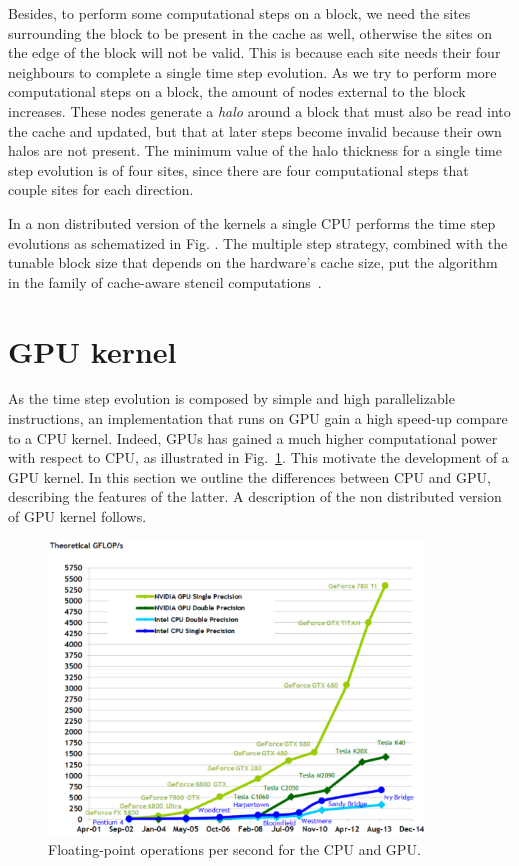 Besides, to perform some computational steps on a block, we need the sites surrounding the block to be present in the cache as well, otherwise the sites on the edge of the block will not be valid. This is because each site needs their four neighbours to complete a single time step evolution. As we try to perform more computational steps on a block, the amount of nodes external to the block increases. These nodes generate a \textit{halo} around a block that must also be read into the cache and updated, but that at later steps become invalid because their own halos are not present. The minimum value of the halo thickness for a single time step evolution is of four sites, since there are four computational steps that couple sites for each direction.

In a non distributed version of the kernels a single CPU performs the time step evolutions as schematized in Fig.%
. The multiple step strategy, combined with the tunable block size that depends on the hardware's cache size, put the algorithm in the family of cache-aware stencil computations~\cite{kamil2006implicit}.


\section{GPU kernel}
As the time step evolution is composed by simple and high parallelizable instructions, an implementation that runs on GPU gain a high speed-up compare to a CPU kernel. Indeed, GPUs has gained a much higher computational power with respect to CPU, as illustrated in Fig.~\ref{fig:CPU-GPU-computational-power}. This motivate the development of a GPU kernel. In this section we outline the differences between CPU and GPU, describing the features of the latter. A description of the non distributed version of GPU kernel follows.
\begin{figure}
   \centering
   \includegraphics[width=10cm]{Figs/CPU-GPU_computational_power.eps}
   \caption{Floating-point operations per second for the CPU and GPU.} \label{fig:CPU-GPU-computational-power}
\end{figure}

